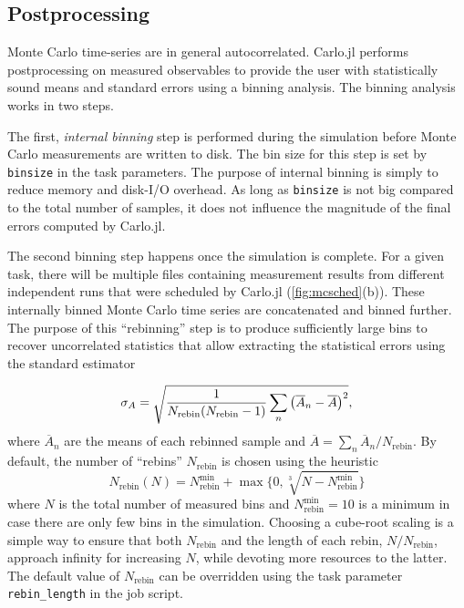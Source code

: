 \documentclass{SciPost}
\begin{document}
\subsection{Postprocessing}
\label{sec:postproc}
Monte Carlo time-series are in general autocorrelated. Carlo.jl performs postprocessing on measured observables to provide the user with statistically sound means and standard errors using a binning analysis. The binning analysis works in two steps.

The first, \textit{internal binning} step is performed during the simulation before Monte Carlo measurements are written to disk. The bin size for this step is set by \texttt{binsize} in the task parameters. The purpose of internal binning is simply to reduce memory and disk-I/O overhead. As long as \texttt{binsize} is not big compared to the total number of samples, it does not influence the magnitude of the final errors computed by Carlo.jl.

The second binning step happens once the simulation is complete. For a given task, there will be multiple files containing measurement results from different independent runs that were scheduled by Carlo.jl (\cref{fig:mcsched}(b)). These internally binned Monte Carlo time series are concatenated and binned further. The purpose of this ``rebinning'' step is to produce sufficiently large bins to recover uncorrelated statistics that allow extracting the statistical errors using the standard estimator

\begin{equation}
\sigma_A = \sqrt{\frac{1}{N_\text{rebin}(N_\text{rebin}-1)} \sum_n \qty(\overline{A}_n-\overline{A})^2},
\end{equation}
where $\overline{A}_n$ are the means of each rebinned sample and $\overline{A} = \sum_n \overline{A}_n / N_\text{rebin}$.
By default, the number of “rebins” $N_\text{rebin}$ is chosen using the heuristic
\begin{equation}
N_\text{rebin}(N) = N_\text{rebin}^\text{min} + \max\{0, \sqrt[3]{N-N_\text{rebin}^\text{min}}\}
\end{equation}
where $N$ is the total number of measured bins and $N_\text{rebin}^\text{min}=10$ is a minimum in case there are only few bins in the simulation. Choosing a cube-root scaling is a simple way to ensure that both $N_\text{rebin}$ and the length of each rebin, $N/N_\text{rebin}$, approach infinity for increasing $N$, while devoting more resources to the latter. The default value of $N_\text{rebin}$ can be overridden using the task parameter \texttt{rebin\_{}length} in the job script.
\end{document}

